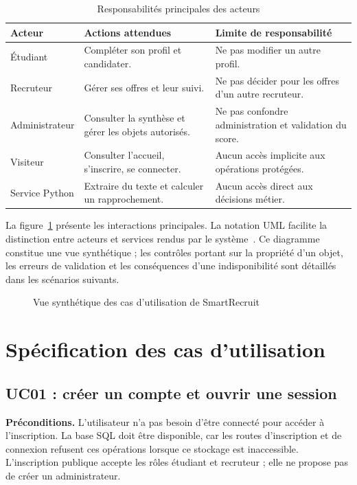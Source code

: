 \begin{table}[htbp]
\centering
\small
\caption{Responsabilités principales des acteurs}
\label{tab:acteurs-besoins}
\begin{tabularx}{\textwidth}{@{}P{0.19\textwidth}XX@{}}
\toprule
Acteur & Actions attendues & Limite de responsabilité \\
\midrule
Étudiant & Compléter son profil et candidater. & Ne pas modifier un autre profil. \\
Recruteur & Gérer ses offres et leur suivi. & Ne pas décider pour les offres d'un autre recruteur. \\
Administrateur & Consulter la synthèse et gérer les objets autorisés. & Ne pas confondre administration et validation du score. \\
Visiteur & Consulter l'accueil, s'inscrire, se connecter. & Aucun accès implicite aux opérations protégées. \\
Service Python & Extraire du texte et calculer un rapprochement. & Aucun accès direct aux décisions métier. \\
\bottomrule
\end{tabularx}
\end{table}

La figure~\ref{fig:usecases-besoins} présente les interactions principales. La notation UML facilite la distinction entre acteurs et services rendus par le système~\cite{omg-uml}. Ce diagramme constitue une vue synthétique ; les contrôles portant sur la propriété d'un objet, les erreurs de validation et les conséquences d'une indisponibilité sont détaillés dans les scénarios suivants.

\begin{figure}[htbp]
\centering

\caption{Vue synthétique des cas d'utilisation de SmartRecruit}
\label{fig:usecases-besoins}
\end{figure}

\section{Spécification des cas d'utilisation}

\subsection{UC01 : créer un compte et ouvrir une session}

\textbf{Préconditions.} L'utilisateur n'a pas besoin d'être connecté pour accéder à l'inscription. La base SQL doit être disponible, car les routes d'inscription et de connexion refusent ces opérations lorsque ce stockage est inaccessible. L'inscription publique accepte les rôles étudiant et recruteur ; elle ne propose pas de créer un administrateur.

